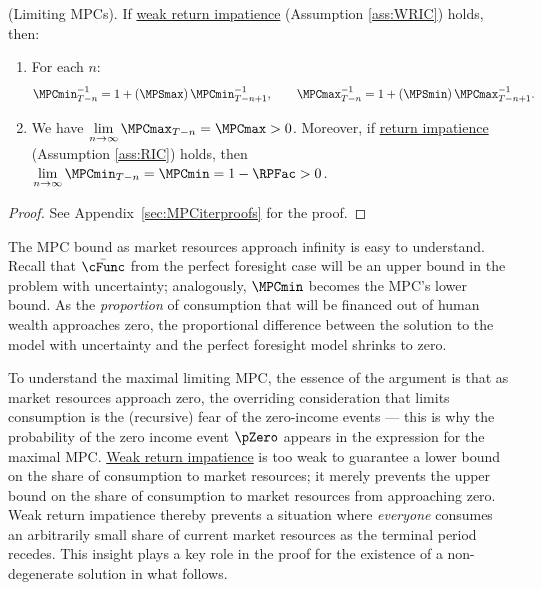 \documentclass[BufferStockTheory]{subfiles}
\begin{document}
\begin{lemma}(Limiting MPCs).
\label{lemm:MPC}
If \hyperlink{WRIC}{weak return impatience} (Assumption \ref{ass:WRIC}) holds, then:

\begin{enumerate}[label=(\roman*)]
\item For each $n$:
%
\begin{equation}\label{eq:MPCminInv}
\MPCmin_{T-n}^{-1}  = 1+\left(\MPSmax\right) \MPCmin_{T-n+1}^{-1}, \qquad \MPCmax_{T-n}^{-1}   = 1+\left(\MPSmin\right) \MPCmax_{T-n+1}^{-1}.
\end{equation}

\item  We have $\lim\limits_{n \rightarrow \infty }\MPCmax_{T-n} = \MPCmax>0$.
Moreover, if \hyperlink{RIC}{return impatience} (Assumption \ref{ass:RIC}) holds, then $\lim\limits_{n \rightarrow  \infty}\MPCmin_{T-n} = \MPCmin = 1- \RPFac>0$.

\end{enumerate}
\end{lemma}
\begin{proof}\let\qed\relax
  See Appendix~\ref{sec:MPCiterproofs} for the proof.

  \end{proof}

The MPC bound as market resources approach infinity is easy to understand.
Recall that $\bar{\cFunc}$ from the perfect foresight case will be an upper bound in the problem with uncertainty; analogously, $\MPCmin$ becomes the MPC's lower bound.
As the \textit{proportion} of consumption that will be financed out of human wealth approaches zero, the proportional difference between the solution to the model with uncertainty and the perfect foresight model shrinks to zero.


To understand the maximal limiting MPC, the essence of the argument is that as market resources approach zero, the overriding consideration that limits consumption is the (recursive) fear of the zero-income events --- this is why the probability of the zero income event $\pZero$ appears in the expression for the maximal MPC.
\hyperlink{WRIC}{Weak return impatience} is too weak to guarantee a lower bound on the share of consumption to market resources; it merely prevents the upper bound on the share of consumption to market resources from approaching zero.
Weak return impatience thereby prevents a situation where \textit{everyone} consumes an arbitrarily small share of current market resources as the terminal period recedes.
This insight plays a key role in the proof for the existence of a non-degenerate solution in what follows.
\end{document}
